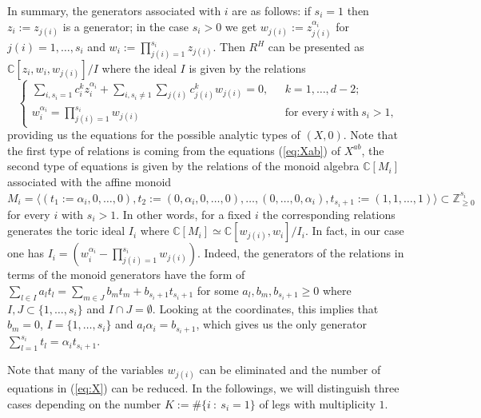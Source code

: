 \documentclass[oneside]{amsart}
\numberwithin{equation}{section}
\numberwithin{equation}{subsection}
\theoremstyle{plain}
\theoremstyle{definition}
\def\C{\mathbb C}
\def\Z{\mathbb Z}
\newcommand{\al}{\alpha}
\renewcommand{\Z}{\mathbb{Z}}
\begin{document}
In summary, the generators associated with $i$ are as follows: if $s_i=1$ then $z_i:=z_{j(i)}$ is a generator; in the case $s_i>0$ we get $w_{j(i)}:=z^{\al_i}_{j(i)}$ for $j(i)=1,\dots,s_i$ and $w_i:=\prod_{j(i)=1}^{s_i} z_{j(i)}$. Then $R^H$ can be presented as $\C[z_i,w_i,w_{j(i)}]/I$ where the ideal $I$ is given by the relations
\begin{equation}\label{eq:X}
\begin{cases}
\sum_{i,s_i=1} c^k_{i} z_{i}^{\al_i}+\sum_{i,s_i\neq 1}\sum_{j(i)}c^k_{j(i)} w_{j(i)}=0, \ \ \ & k=1,\dots,d-2;\\
w_i^{\al_i}=\prod_{j(i)=1}^{s_i} w_{j(i)}  \ & \mbox{for every} \ i \ \mbox{with} \ s_i>1,
\end{cases}
\end{equation}
providing us the equations for the possible analytic types of $(X,0)$. 
Note that the first type of relations is coming from the equations (\ref{eq:Xab}) of $X^{ab}$, the second type of equations is given by the relations of the monoid algebra $\C[M_i]$ associated with the affine monoid $M_i=\langle (t_1:=\al_i,0,\dots,0), t_2:=(0,\al_i,0,\dots,0),\dots, (0,\dots,0,\al_i),t_{s_i+1}:=(1,1,\dots,1)\rangle\subset \Z^{s_i}_{\geq 0}$ for every $i$ with $s_i>1$. In other words, for a fixed $i$ the corresponding relations generates the toric ideal $I_i$ where $\C[M_i]\simeq \C[w_{j(i)},w_i]/I_i$. In fact, in our case one has $I_i=(w_i^{\al_i}-\prod_{j(i)=1}^{s_i} w_{j(i)})$. 
Indeed, the generators of the relations in terms of the monoid generators have the form of $\sum_{l\in I}a_l t_l=\sum_{m\in J}b_m t_m+b_{s_i+1}t_{s_i+1}$ for some $a_l,b_m,b_{s_i+1}\geq 0$ where $I,J\subset \{1,\dots,s_i\}$ and  $I\cap J=\emptyset$. Looking at the coordinates, this implies that  $b_m=0$, $I=\{1,\dots,s_i\}$ and $a_l\al_i=b_{s_i+1}$, which gives us the only generator $\sum_{l=1}^{s_i}t_l=\al_it_{s_{i}+1}$.   


Note that many of the variables $w_{j(i)}$ can be eliminated and the number of equations in (\ref{eq:X}) can be reduced. In the followings, we will distinguish three cases depending on the number $K:=\#\{i \ : \ s_i=1\}$ of legs with multiplicity $1$.  
\vspace{0.3cm}
\end{document}
